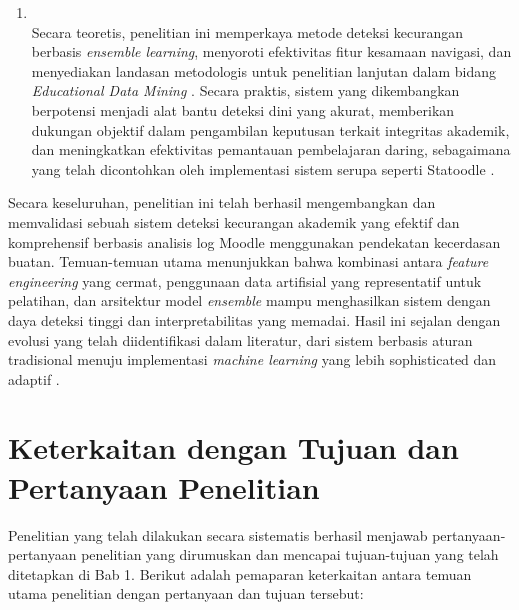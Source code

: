 \begin{enumerate}
    \item {} \\
    Secara teoretis, penelitian ini memperkaya metode deteksi kecurangan berbasis \textit{ensemble learning}, menyoroti efektivitas fitur kesamaan navigasi, dan menyediakan landasan metodologis untuk penelitian lanjutan dalam bidang \textit{Educational Data Mining} \cite{Romero2020}. Secara praktis, sistem yang dikembangkan berpotensi menjadi alat bantu deteksi dini yang akurat, memberikan dukungan objektif dalam pengambilan keputusan terkait integritas akademik, dan meningkatkan efektivitas pemantauan pembelajaran daring, sebagaimana yang telah dicontohkan oleh implementasi sistem serupa seperti Statoodle \cite{MorenoMarcos2023}.

\end{enumerate}
Secara keseluruhan, penelitian ini telah berhasil mengembangkan dan memvalidasi sebuah sistem deteksi kecurangan akademik yang efektif dan komprehensif berbasis analisis log Moodle menggunakan pendekatan kecerdasan buatan. Temuan-temuan utama menunjukkan bahwa kombinasi antara \textit{feature engineering} yang cermat, penggunaan data artifisial yang representatif untuk pelatihan, dan arsitektur model \textit{ensemble} mampu menghasilkan sistem dengan daya deteksi tinggi dan interpretabilitas yang memadai. Hasil ini sejalan dengan evolusi yang telah diidentifikasi dalam literatur, dari sistem berbasis aturan tradisional \cite{article:rule_based_limitations} menuju implementasi \textit{machine learning} yang lebih sophisticated dan adaptif \cite{Kamalov2021, Yulita2023}.

\section{Keterkaitan dengan Tujuan dan Pertanyaan Penelitian}
\label{sec:keterkaitan_tujuan_pertanyaan_bab5}
Penelitian yang telah dilakukan secara sistematis berhasil menjawab pertanyaan-pertanyaan penelitian yang dirumuskan dan mencapai tujuan-tujuan yang telah ditetapkan di Bab 1. Berikut adalah pemaparan keterkaitan antara temuan utama penelitian dengan pertanyaan dan tujuan tersebut:

